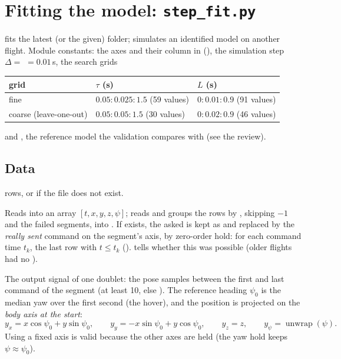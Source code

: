 \section{Fitting the model: \texorpdfstring{\texttt{step\_fit.py}}{step\_fit.py}}\label{sec:stepfit}

 fits the latest (or the given)  folder;
 simulates an identified model on another flight. Module constants: the axes
 and their column in  (), the simulation step
$\Delta = $  $= 0.01$\,s, the search grids
\begin{center}
\begin{tabular}{@{}lll@{}}
\toprule
grid & $\tau$ (s) & $L$ (s) \\
\midrule
fine & $0.05:0.025:1.5$ (59 values) & $0:0.01:0.9$ (91 values) \\
coarse (leave-one-out) & $0.05:0.05:1.5$ (30 values) & $0:0.02:0.9$ (46 values) \\
\bottomrule
\end{tabular}
\end{center}
and , the reference model the validation compares with (see the review).

\subsection{Data}

 rows, or \code{[]} if the file does not exist.

Reads  into an array $[t, x, y, z, \psi]$; reads  and groups the rows by
, skipping $-1$ and the failed segments, into . If
 exists, the asked  is kept as  and replaced by the \emph{really sent}
command on the segment's axis, by zero-order hold: for each command time $t_k$, the last  row with
$t \le t_k$ ().  tells whether this was possible (older
flights had no ).

The output signal of one doublet: the pose samples between the first and last command of the segment (at least
10, else ). The reference heading $\psi_0$ is the median yaw over the first second (the hover), and the
position is projected on the \emph{body axis at the start}:
$$
y_x = x\cos\psi_0 + y\sin\psi_0, \qquad y_y = -x\sin\psi_0 + y\cos\psi_0, \qquad y_z = z, \qquad y_\psi = \operatorname{unwrap}(\psi).
$$
Using a fixed axis is valid because the other axes are held (the yaw hold keeps $\psi \approx \psi_0$).

